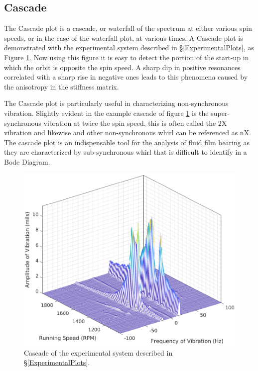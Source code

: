 \subsection{Cascade}
The Cascade plot is a cascade, or waterfall of the spectrum at either various spin speeds, or in the case of the waterfall plot, at various times. A Cascade plot is demonstrated with the experimental system described in \S\ref{ExperimentalPlots}, as Figure \ref{fig:ExpExampleCascade}. Now using this figure it is easy to detect the portion of the start-up in which the orbit is opposite the spin speed. A sharp dip in positive resonances correlated with a sharp rise in negative ones leads to this phenomena caused by the anisotropy in the stiffness matrix.\par 
The Cascade plot is particularly useful in characterizing non-synchronous vibration. Slightly evident in the example cascade of figure \ref{fig:ExpExampleCascade} is the super-synchronous vibration at twice the spin speed, this is often called the 2X vibration and likewise and other non-synchronous whirl can be referenced as nX. The cascade plot is an indispensable tool for the analysis of fluid film bearing as they are characterized by sub-synchronous whirl that is difficult to identify in a Bode Diagram.\par 
\begin{figure}
	\centering
	\includegraphics[width=\linewidth]{./figures/ExpExampleCascade.pdf}
	\caption{Cascade of the experimental system described in \S\ref{ExperimentalPlots}.}
	\label{fig:ExpExampleCascade}
\end{figure}
